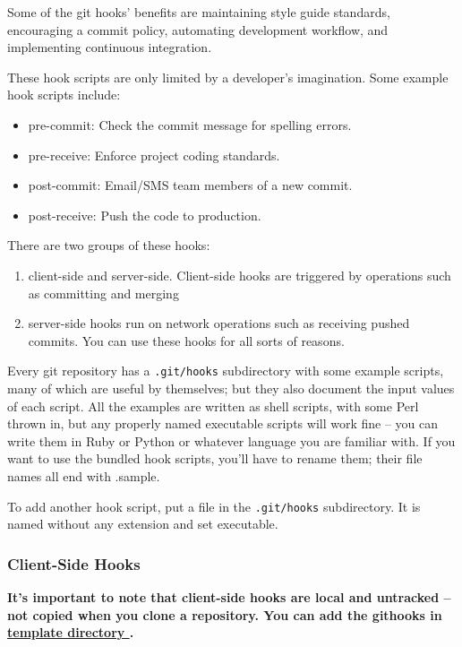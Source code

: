 Some of the git hooks' benefits are maintaining style guide standards, encouraging a commit policy, automating development workflow, and implementing continuous integration.

These hook scripts are only limited by a developer's imagination. Some example hook scripts include:
\begin{itemize}
  \item    pre-commit: Check the commit message for spelling errors.
  \item    pre-receive: Enforce project coding standards.
  \item    post-commit: Email/SMS team members of a new commit.
  \item    post-receive: Push the code to production.
\end{itemize}


There are two groups of these hooks: 

\begin{enumerate}
  \item client-side and server-side. Client-side hooks are triggered by operations such as committing and merging
  \item server-side hooks run on network operations such as receiving pushed commits. You can use these hooks for all sorts of reasons.
\end{enumerate}




Every git repository has a \texttt{.git/hooks} subdirectory with some example scripts, many of which are useful by themselves; but they also document the input values of each script. All the examples are written as shell scripts, with some Perl thrown in, but any properly named executable scripts will work fine – you can write them in Ruby or Python or whatever language you are familiar with. If you want to use the bundled hook scripts, you’ll have to rename them; their file names all end with .sample.

To add another hook script, put a file in the \texttt{.git/hooks} subdirectory. It is named without any extension and set executable.

\subsubsection{Client-Side Hooks}%


\textbf{It’s important to note that client-side hooks are local and untracked -- not copied when you clone a repository. You can add the githooks in \href{https://git-scm.com/docs/git-init\#\_template\_directory}{template directory }.}


